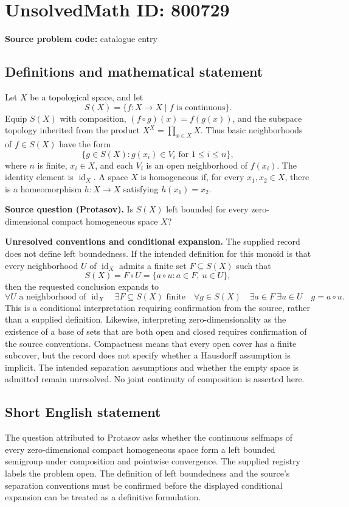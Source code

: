 \documentclass[11pt]{article}
\begin{document}
\section*{UnsolvedMath ID: 800729}
\textbf{Source problem code:} catalogue entry
\subsection{Definitions and mathematical statement}
Let \(X\) be a topological space, and let
\[
S(X)=\{f:X\to X\mid f\text{ is continuous}\}.
\]
Equip \(S(X)\) with composition, \((f\circ g)(x)=f(g(x))\), and the subspace topology inherited from the product \(X^X=\prod_{x\in X}X\). Thus basic neighborhoods of \(f\in S(X)\) have the form
\[
\{g\in S(X):g(x_i)\in V_i\text{ for }1\leq i\leq n\},
\]
where \(n\) is finite, \(x_i\in X\), and each \(V_i\) is an open neighborhood of \(f(x_i)\). The identity element is \(\operatorname{id}_X\). A space \(X\) is homogeneous if, for every \(x_1,x_2\in X\), there is a homeomorphism \(h:X\to X\) satisfying \(h(x_1)=x_2\).

\textbf{Source question (Protasov).} Is \(S(X)\) left bounded for every zero-dimensional compact homogeneous space \(X\)?

\textbf{Unresolved conventions and conditional expansion.} The supplied record does not define left boundedness. If the intended definition for this monoid is that every neighborhood \(U\) of \(\operatorname{id}_X\) admits a finite set \(F\subseteq S(X)\) such that
\[
S(X)=F\circ U
     =\{a\circ u:a\in F,\ u\in U\},
\]
then the requested conclusion expands to
\[
\forall U\text{ a neighborhood of }\operatorname{id}_X\quad
\exists F\subseteq S(X)\text{ finite}\quad
\forall g\in S(X)\quad
\exists a\in F\ \exists u\in U\quad g=a\circ u.
\]
This is a conditional interpretation requiring confirmation from the source, rather than a supplied definition. Likewise, interpreting zero-dimensionality as the existence of a base of sets that are both open and closed requires confirmation of the source conventions. Compactness means that every open cover has a finite subcover, but the record does not specify whether a Hausdorff assumption is implicit. The intended separation assumptions and whether the empty space is admitted remain unresolved. No joint continuity of composition is asserted here.
\subsection{Short English statement}
The question attributed to Protasov asks whether the continuous selfmaps of every zero-dimensional compact homogeneous space form a left bounded semigroup under composition and pointwise convergence. The supplied registry labels the problem open. The definition of left boundedness and the source's separation conventions must be confirmed before the displayed conditional expansion can be treated as a definitive formulation.
\end{document}

